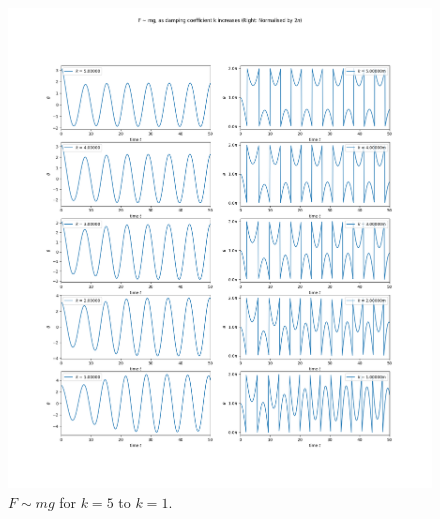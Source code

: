 \documentclass[10pt, twocolumn]{article}
\begin{document}
\begin{figure}[H]
    \centering
    \includegraphics[width = \columnwidth]{Projects/ForcedSimplePendulum/Plots/F~mg as damping coefficient k increases from 5 to 1.png}
    \caption{$F \sim{mg}$ for $k = 5$ to $k = 1$.}
    \label{k 5 to 1}
\end{figure}
\end{document}
